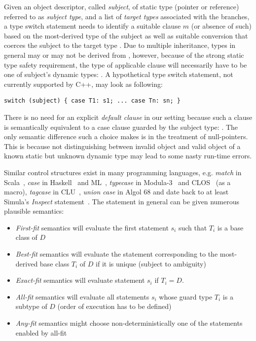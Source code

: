 Given an object descriptor, called \emph{subject}, of static type  
(pointer or reference) referred to as \emph{subject type}, and a list of 
\emph{target types}  associated with the branches, a type switch 
statement needs to identify a suitable clause $m$ (or absence of such) based on 
the most-derived type  of the subject as well as suitable 
conversion that coerces the subject to the target type .  
Due to multiple inheritance, types  in general may or may not be 
derived from , however, because of the strong static type safety 
requirement, the type of applicable clause  will necessarily have to be 
one of subject's dynamic types: . A hypothetical type switch 
statement, not currently supported by C++, may look as following:

\begin{lstlisting}[keepspaces]
switch (subject) { case T1: s1; ... case Tn: sn; }
\end{lstlisting}

\noindent
There is no need for an explicit \emph{default clause} in our setting because 
such a clause is semantically equivalent to a case clause guarded by the 
subject type: . The only semantic difference such a choice 
makes is in the treatment of null-pointers.
This is because not distinguishing between 
invalid object and valid object of a known static but unknown dynamic type may 
lead to some nasty run-time errors.

Similar control structures exist in many programming languages, e.g. 
\emph{match} in Scala~\cite{Scala2nd}, \emph{case} in Haskell~\cite{Haskell98Book} and 
ML~\cite{ML90}, \emph{typecase} in Modula-3~\cite{Modula3TS} and CLOS~\cite{??} (as a 
macro), \emph{tagcase} in CLU~\cite{CLURefMan}, \emph{union case} in Algol 68 
and date back to at least Simula's \emph{Inspect} statement~\cite{Simula67}. 
The statement in general can be given numerous plausible semantics:

\begin{itemize}
\setlength{\itemsep}{0pt}
\setlength{\parskip}{0pt}
\item \emph{First-fit} semantics will evaluate the first statement $s_i$ such 
      that $T_i$ is a base class of $D$
\item \emph{Best-fit} semantics will evaluate the statement corresponding to the 
      most-derived base class $T_i$ of $D$ if it is unique (subject to 
      ambiguity)
\item \emph{Exact-fit} semantics will evaluate statement $s_i$ if $T_i=D$.
\item \emph{All-fit} semantics will evaluate all statements $s_i$ whose guard 
      type $T_i$ is a subtype of $D$ (order of execution has to be defined)
\item \emph{Any-fit} semantics might choose non-deterministically one of the 
      statements enabled by all-fit
\end{itemize}

